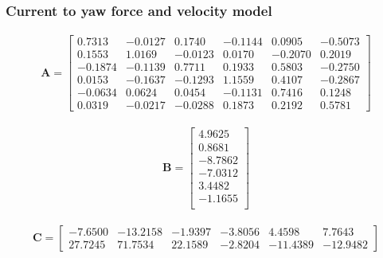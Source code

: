 \subsubsection{Current to yaw force and velocity model}
\begin{align}
\mathbf{A} = \begin{bmatrix}
    0.7313   &-0.0127    &0.1740   &-0.1144    &0.0905   &-0.5073\\
    0.1553    &1.0169   &-0.0123    &0.0170   &-0.2070    &0.2019\\
   -0.1874   &-0.1139   &0.7711    &0.1933    &0.5803   &-0.2750\\
    0.0153   &-0.1637   &-0.1293    &1.1559    &0.4107   &-0.2867\\
   -0.0634    &0.0624    &0.0454   &-0.1131    &0.7416    &0.1248\\
    0.0319   &-0.0217   &-0.0288    &0.1873    &0.2192    &0.5781
     \end{bmatrix}
\end{align}

\begin{align}
\mathbf{B} = \begin{bmatrix}
    4.9625\\
    0.8681\\
   -8.7862\\
   -7.0312\\
    3.4482\\
   -1.1655\\
     \end{bmatrix}
\end{align}

\begin{align}
\mathbf{C} = \begin{bmatrix}
   -7.6500  &-13.2158   &-1.9397   &-3.8056    &4.4598    &7.7643\\
   27.7245   &71.7534   &22.1589   &-2.8204  &-11.4389  &-12.9482     
\end{bmatrix}
\end{align}